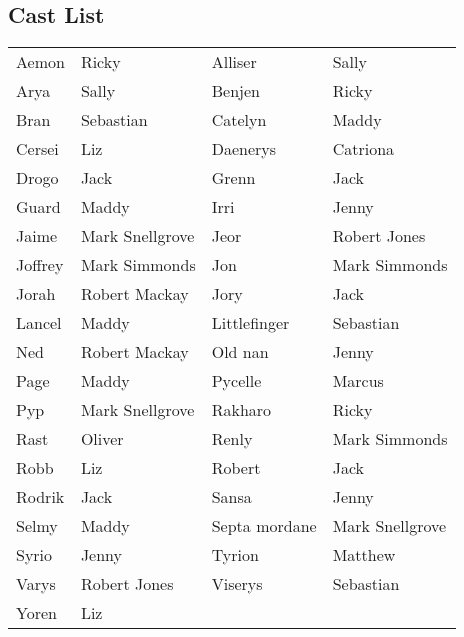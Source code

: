 \subsection*{Cast List}
\begin{tabular}{ll|ll}\\
Aemon & Ricky &  Alliser & Sally\\
Arya & Sally &  Benjen & Ricky\\
Bran & Sebastian &  Catelyn & Maddy\\
Cersei & Liz &  Daenerys & Catriona\\
Drogo & Jack &  Grenn & Jack\\
Guard & Maddy &  Irri & Jenny\\
Jaime & Mark Snellgrove &  Jeor & Robert Jones\\
Joffrey & Mark Simmonds &  Jon & Mark Simmonds\\
Jorah & Robert Mackay &  Jory & Jack\\
Lancel & Maddy &  Littlefinger & Sebastian\\
Ned & Robert Mackay &  Old nan & Jenny\\
Page & Maddy &  Pycelle & Marcus\\
Pyp & Mark Snellgrove &  Rakharo & Ricky\\
Rast & Oliver &  Renly & Mark Simmonds\\
Robb & Liz &  Robert & Jack\\
Rodrik & Jack &  Sansa & Jenny\\
Selmy & Maddy &  Septa mordane & Mark Snellgrove\\
Syrio & Jenny &  Tyrion & Matthew\\
Varys & Robert Jones &  Viserys & Sebastian\\
Yoren & Liz &  \end{tabular}
